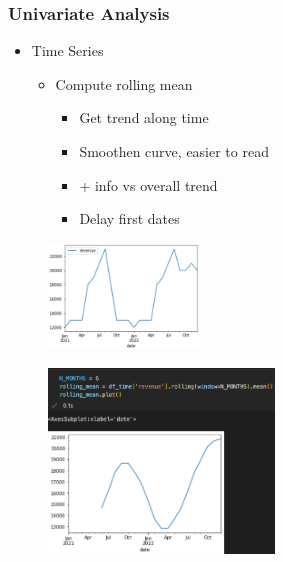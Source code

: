 \begin{frame}\frametitle{Univariate Analysis}
   \begin{minipage}{0.48\linewidth}
      \begin{itemize}
         \item Time Series
         \begin{itemize}
            \item Compute rolling mean
            \begin{itemize}
               \item Get trend along time
               \item Smoothen curve, easier to read
               \item + info vs overall trend
               \item Delay first dates
            \end{itemize}
         \end{itemize}
      \end{itemize}
      \vspace{.5cm}
      \begin{figure}[H]
         \includegraphics[width=4cm]{../images/illustrations/pattern_graph_time_series.jpg}
      \end{figure}
   \end{minipage}
   \begin{minipage}{0.48\linewidth}
      \begin{figure}[H]
         \includegraphics[width=6cm]{../images/illustrations/pattern_graph_time_series_moving_average.png}
      \end{figure}
   \end{minipage}
\end{frame}


